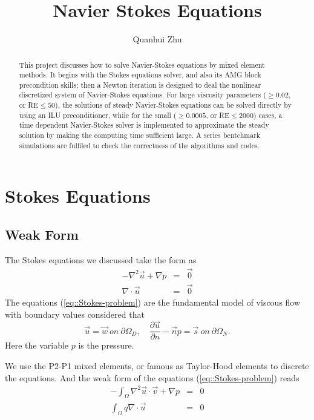 \documentclass[a4paper]{article}
\title{Navier Stokes Equations}
\author{Quanhui Zhu}
\begin{document}
\maketitle

\begin{abstract}
  This project discusses how to solve Navier-Stokes equations by mixed
  element methods. It begins with the Stokes equations solver, and
  also its AMG block precondition skills; then a Newton iteration is
  designed to deal the nonlinear discretized system of Navier-Stokes
  equations.  For large viscosity parameters ($\geq 0.02$, or RE$\leq
  50$), the solutions of steady Navier-Stokes equations can be solved
  directly by using an ILU preconditioner, while for the small ($\geq
  0.0005$, or RE$\leq 2000$) cases, a time dependent Navier-Stokes
  solver is implemented to approximate the steady solution by making
  the computing time sufficient large. A series bentchmark simulations
  are fulfiled to check the correctness of the algorithms and codes.
\end{abstract}


\section{Stokes Equations}

\subsection{Weak Form}

The Stokes equations we discussed take the form as
\begin{equation}
\begin{array}{rcl}
-\nabla^2 \vec{u} + \nabla p &=& \vec{0} \\
\nabla \cdot \vec{u} &=& \vec{0}
\label{eq::Stokes-problem}
\end{array}
\end{equation}
The equations (\ref{eq::Stokes-problem}) are the fundamental model of
viscous flow with boundary values considered that
\begin{equation}
\vec{u} = \vec{w} \ on \ \partial \Omega_D ,\quad \frac{\partial
  \vec{u}}{\partial n} - \vec{n} p = \vec{s} \ on \ \partial \Omega_N.
\end{equation}
Here the variable $p$ is the pressure.

We use the P2-P1 mixed elements, or famous as Taylor-Hood elements
\cite{Lee2005Finite} to discrete the equations. And the weak form of
the equations (\ref{eq::Stokes-problem}) reads
\begin{equation}
\begin{array}{rcl}
-\int_\Omega \nabla^2 \vec{u} \cdot \vec{v} + \nabla p &=& 0\\
\int_\Omega q\nabla \cdot \vec{u} &=&0
\label{eq::Stokes-weakform}
\end{array}
\end{equation}
\end{document}
